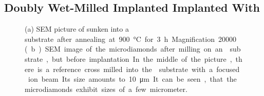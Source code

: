 	\subsection{Doubly Wet-Milled Implanted \Nds Implanted With \Si}\label{subsec::2_milled_nds}


	\begin{figure}[tp]
		\begin{subfigure}[t]{ 0.49\linewidth}
			\centering
			\caption{}\label{subfig::sunken_nd}
		\end{subfigure}
		\hfill
		\begin{subfigure}[t]{ 0.49\linewidth}
			\centering
			\caption{}\label{subfig::microdiamonds}
		\end{subfigure}
		\caption{(a) SEM picture of \nds sunken into a \si substrate after annealing at \SI{900}{\celsius} for \SI{3}{h}. Magnification \num{20000}. (b) SEM image of the microdiamonds after milling on an \ir substrate, but before implantation. In the middle of the picture, there is a reference cross milled into the \ir substrate with a focused ion beam. Its size amounts to \SI{10}{\micro\meter}. It can be seen, that the microdiamonds exhibit sizes of a few micrometer.}
		\label{fig::<fig>}
	\end{figure}

